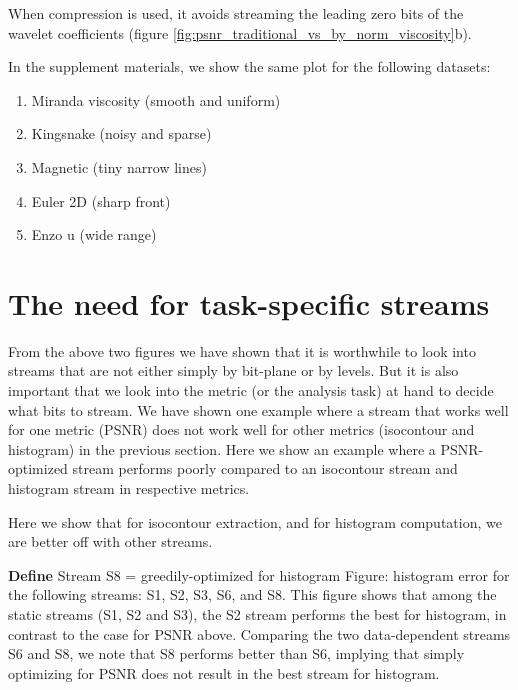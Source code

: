 When compression is used, it avoids streaming the leading zero bits of the wavelet coefficients (figure \ref{fig:psnr_traditional_vs_by_norm_viscosity}b).

In the supplement materials, we show the same plot for the following datasets:
\begin{enumerate}
  \item Miranda viscosity (smooth and uniform)
  \item Kingsnake (noisy and sparse)
  \item Magnetic (tiny narrow lines)
  \item Euler 2D (sharp front)
  \item Enzo u (wide range)
\end{enumerate}

\section{The need for task-specific streams}
From the above two figures we have shown that it is worthwhile to look into streams that are not either simply by bit-plane or by levels. But it is also important that we look into the metric (or the analysis task) at hand to decide what bits to stream. We have shown one example where a stream that works well for one metric (PSNR) does not work well for other metrics (isocontour and histogram) in the previous section. Here we show an example where a PSNR-optimized stream performs poorly compared to an isocontour stream and histogram stream in respective metrics.

Here we show that for isocontour extraction, and for histogram computation, we are better off with other streams.

\textbf{Define} Stream S8 = greedily-optimized for histogram
Figure: histogram error for the following streams: S1, S2, S3, S6, and S8. This figure shows that among the static streams (S1, S2 and S3), the S2 stream performs the best for histogram, in contrast to the case for PSNR above. Comparing the two data-dependent streams S6 and S8, we note that S8 performs better than S6, implying that simply optimizing for PSNR does not result in the best stream for histogram.

